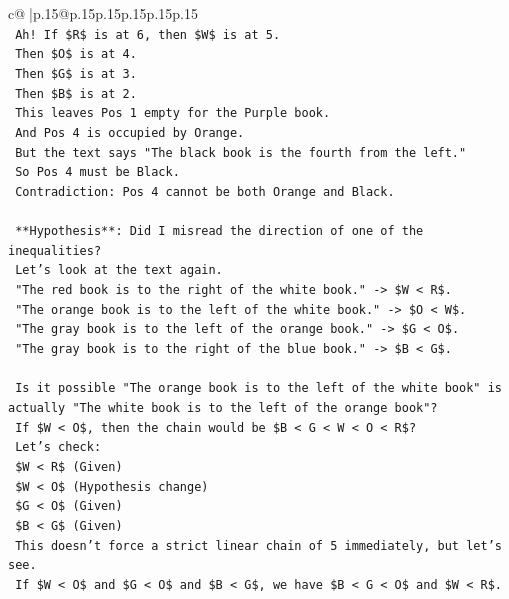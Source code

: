 \documentclass{article}
\begin{document}
{\begin{supertabular}{c@{$\;$}|p{.15\linewidth}@{}p{.15\linewidth}p{.15\linewidth}p{.15\linewidth}p{.15\linewidth}p{.15\linewidth}}
{{{\\ 
\texttt{    Ah! If \$R\$ is at 6, then \$W\$ is at 5.} \\
\texttt{    Then \$O\$ is at 4.} \\
\texttt{    Then \$G\$ is at 3.} \\
\texttt{    Then \$B\$ is at 2.} \\
\texttt{    This leaves Pos 1 empty for the Purple book.} \\
\texttt{    And Pos 4 is occupied by Orange.} \\
\texttt{    But the text says "The black book is the fourth from the left."} \\
\texttt{    So Pos 4 must be Black.} \\
\texttt{    Contradiction: Pos 4 cannot be both Orange and Black.} \\
\\ 
\texttt{    **Hypothesis**: Did I misread the direction of one of the inequalities?} \\
\texttt{    Let's look at the text again.} \\
\texttt{    "The red book is to the right of the white book." {-}> \$W < R\$.} \\
\texttt{    "The orange book is to the left of the white book." {-}> \$O < W\$.} \\
\texttt{    "The gray book is to the left of the orange book." {-}> \$G < O\$.} \\
\texttt{    "The gray book is to the right of the blue book." {-}> \$B < G\$.} \\
\\ 
\texttt{    Is it possible "The orange book is to the left of the white book" is actually "The white book is to the left of the orange book"?} \\
\texttt{    If \$W < O\$, then the chain would be \$B < G < W < O < R\$?} \\
\texttt{    Let's check:} \\
\texttt{    \$W < R\$ (Given)} \\
\texttt{    \$W < O\$ (Hypothesis change)} \\
\texttt{    \$G < O\$ (Given)} \\
\texttt{    \$B < G\$ (Given)} \\
\texttt{    This doesn't force a strict linear chain of 5 immediately, but let's see.} \\
\texttt{    If \$W < O\$ and \$G < O\$ and \$B < G\$, we have \$B < G < O\$ and \$W < R\$.} \\
}}}
\end{supertabular}}
\end{document}
